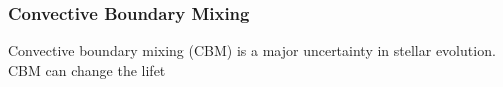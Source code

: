 {\color{purple}
\subsubsection{Convective Boundary Mixing}
}


Convective boundary mixing (CBM) is a major uncertainty in stellar evolution. CBM can change the lifet

